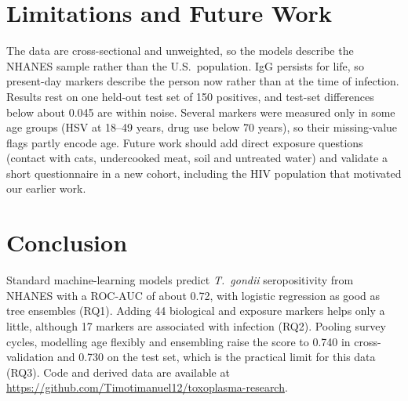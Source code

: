 \documentclass[conference]{IEEEtran}
\begin{document}
\section{Limitations and Future Work}
The data are cross-sectional and unweighted, so the models describe the NHANES sample rather than the U.S.\ population. IgG persists for
life, so present-day markers describe the person now rather than at the time of infection. Results rest on one held-out test set of 150
positives, and test-set differences below about 0.045 are within noise. Several markers were measured only in some age groups (HSV at 18--49 years, drug use below 70 years), so their missing-value flags partly encode age. Future work should add direct exposure questions (contact with
cats, undercooked meat, soil and untreated water) and validate a short questionnaire in a new cohort, including the HIV population that
motivated our earlier work.

\section{Conclusion}
Standard machine-learning models predict \emph{T.\ gondii} seropositivity from NHANES with a ROC-AUC of about 0.72, with logistic
regression as good as tree ensembles (RQ1). Adding 44 biological and exposure markers helps only a little, although 17 markers are
associated with infection (RQ2). Pooling survey cycles, modelling age flexibly and ensembling raise the score to 0.740 in cross-validation
and 0.730 on the test set, which is the practical limit for this data (RQ3). Code and derived data are available at
\url{https://github.com/Timotimanuel12/toxoplasma-research}.
\end{document}
